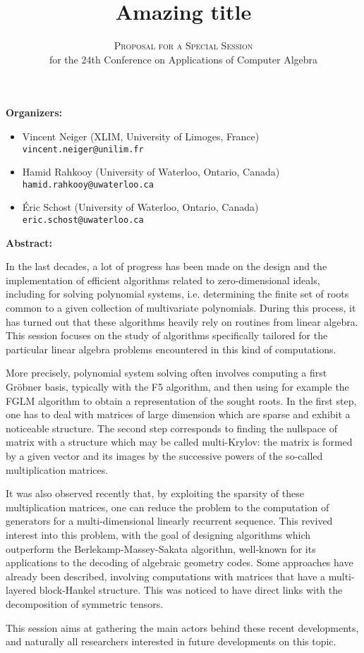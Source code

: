 \documentclass[12pt,english]{article}
\title{Amazing title}
\author{\textsc{Proposal for a Special Session} \\
  for the 24th Conference on Applications of Computer Algebra}
\date{}
\begin{document}
\maketitle

\textbf{Organizers:}
\begin{itemize}
  \item Vincent Neiger (XLIM, University of Limoges, France) \\
    {\small \verb+vincent.neiger@unilim.fr+}
  \item Hamid Rahkooy (University of Waterloo, Ontario, Canada) \\
    {\small \verb+hamid.rahkooy@uwaterloo.ca+}
  \item \'Eric Schost (University of Waterloo, Ontario, Canada) \\
    {\small \texttt{eric.schost@uwaterloo.ca}}
\end{itemize}

\textbf{Abstract:}

In the last decades, a lot of progress has been made on the design and the
implementation of efficient algorithms related to zero-dimensional ideals,
including for solving polynomial systems, i.e. determining the finite set of
roots common to a given collection of multivariate polynomials.  During this
process, it has turned out that these algorithms heavily rely on routines from
linear algebra.  This session focuses on the study of algorithms specifically
tailored for the particular linear algebra problems encountered in this kind of
computations.

More precisely, polynomial system solving often involves computing a first
Gr\"obner basis, typically with the F5 algorithm, and then using for example
the FGLM algorithm to obtain a representation of the sought roots.  In the
first step, one has to deal with matrices of large dimension which are sparse
and exhibit a noticeable structure.  The second step corresponds to finding the
nullspace of matrix with a structure which may be called multi-Krylov: the matrix
is formed by a given vector and its images by the successive powers of the
so-called multiplication matrices.

It was also observed recently that, by exploiting the sparsity of these
multiplication matrices, one can reduce the problem to the computation of
generators for a multi-dimensional linearly recurrent sequence.  This revived
interest into this problem, with the goal of designing algorithms which
outperform the Berlekamp-Massey-Sakata algorithm, well-known for its
applications to the decoding of algebraic geometry codes.  Some approaches have
already been described, involving computations with matrices that have a
multi-layered block-Hankel structure.  This was noticed to have direct links
with the decomposition of symmetric tensors.

This session aims at gathering the main actors behind these recent
developments, and naturally all researchers interested in future developments
on this topic.

\end{document}
